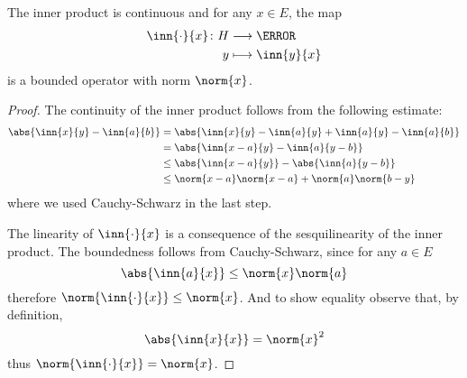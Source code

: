 \documentclass[12pt,oneside]{book}
\begin{document}
\begin{proposition}
	The inner product is continuous and for any \( x \in E \), the map
	\begin{align*}
		\inn{\cdot}{x} \colon H & \longrightarrow \C	\\
		y & \longmapsto \inn{y}{x}
	\end{align*}
	is a bounded operator with norm \( \norm{x} \).
\end{proposition}
\begin{proof}
	The continuity of the inner product follows from the following estimate:
	\begin{align*}
		\abs{\inn{x}{y} - \inn{a}{b}} & = \abs{\inn{x}{y} - \inn{a}{y} + \inn{a}{y} -
		\inn{a}{b}} \\
																	& = \abs{\inn{x-a}{y} - \inn{a}{y-b}} \\
																	& \leq \abs{\inn{x-a}{y}} - \abs{\inn{a}{y-b}} \\
																	& \leq \norm{x-a}\norm{x-a} + \norm{a}\norm{b-y}
	\end{align*}
	where we used Cauchy-Schwarz in the last step.  

	The linearity of \( \inn{\cdot}{x} \) is a consequence of the sesquilinearity of the inner
	product. The boundedness follows from Cauchy-Schwarz, since for any \( a \in E \)
	\begin{equation*}
		\abs{\inn{a}{x}} \leq \norm{x}\norm{a}
	\end{equation*}
	therefore \( \norm{\inn{\cdot}{x}} \leq \norm{x} \). And to show equality observe that,
	by definition,
	\begin{equation*}
		\abs{\inn{x}{x}} = \norm{x}^2
	\end{equation*}
	thus \( \norm{\inn{\cdot}{x}} = \norm{x} \).
\end{proof}
\end{document}
